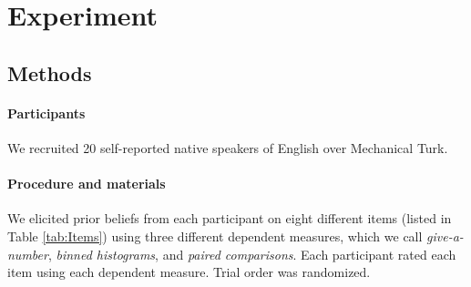 \documentclass[10pt,letterpaper]{article}
\newcommand{\tableref}[1]{Table \ref{#1}}
\begin{document}
\section{Experiment}

\subsection{Methods} 

\paragraph{Participants} We recruited 20 self-reported native speakers of English over Mechanical Turk.

\paragraph{Procedure and materials}

We elicited prior beliefs from each participant on eight different items (listed in \tableref{tab:Items}) using three different dependent measures, which we call \emph{give-a-number}, \emph{binned histograms}, and \emph{paired comparisons}. Each participant rated each item using each dependent measure. Trial order was randomized.
\end{document}

